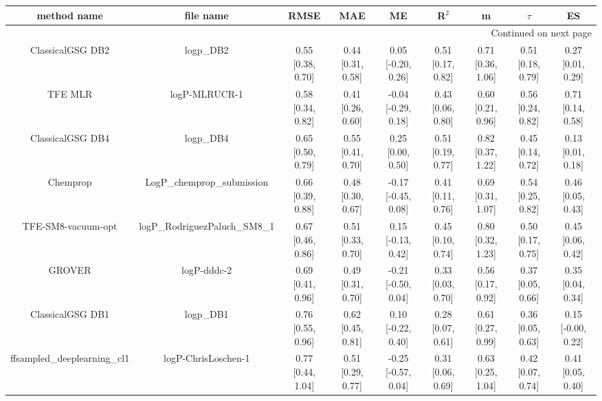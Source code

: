 \documentclass{article}
\begin{document}
\begin{center}
\scriptsize
\begin{longtable}{|ccccccccc|}
\toprule
                  method name &                                      file name &               RMSE &                MAE &                    ME &              R$^2$ &                     m &                $\tau$ &                    ES \\
\midrule
\endhead
\midrule
\multicolumn{9}{r}{{Continued on next page}} \\
\midrule
\endfoot

\bottomrule
\endlastfoot
             ClassicalGSG DB2 &                                      logp\_DB2 &  0.55 [0.38, 0.70] &  0.44 [0.31, 0.58] &    0.05 [-0.20, 0.26] &  0.51 [0.17, 0.82] &     0.71 [0.36, 1.06] &     0.51 [0.18, 0.79] &     0.27 [0.01, 0.29] \\
                      TFE MLR &                                  logP-MLRUCR-1 &  0.58 [0.34, 0.82] &  0.41 [0.26, 0.60] &   -0.04 [-0.29, 0.18] &  0.43 [0.06, 0.80] &     0.60 [0.21, 0.96] &     0.56 [0.24, 0.82] &     0.71 [0.14, 0.58] \\
             ClassicalGSG DB4 &                                      logp\_DB4 &  0.65 [0.50, 0.79] &  0.55 [0.41, 0.70] &     0.25 [0.00, 0.50] &  0.51 [0.19, 0.77] &     0.82 [0.37, 1.22] &     0.45 [0.14, 0.72] &     0.13 [0.01, 0.18] \\
                     Chemprop &                     LogP\_chemprop\_submission &  0.66 [0.39, 0.88] &  0.48 [0.30, 0.67] &   -0.17 [-0.45, 0.08] &  0.41 [0.11, 0.76] &     0.69 [0.31, 1.07] &     0.54 [0.25, 0.82] &     0.46 [0.05, 0.43] \\
           TFE-SM8-vacuum-opt &                  logP\_RodriguezPaluch\_SM8\_1 &  0.67 [0.46, 0.86] &  0.51 [0.33, 0.70] &    0.15 [-0.13, 0.42] &  0.45 [0.10, 0.74] &     0.80 [0.32, 1.23] &     0.50 [0.17, 0.75] &     0.45 [0.06, 0.42] \\
                       GROVER &                                    logP-dddc-2 &  0.69 [0.41, 0.96] &  0.49 [0.31, 0.70] &   -0.21 [-0.50, 0.04] &  0.33 [0.03, 0.70] &     0.56 [0.17, 0.92] &     0.37 [0.05, 0.66] &     0.35 [0.04, 0.34] \\
             ClassicalGSG DB1 &                                      logp\_DB1 &  0.76 [0.55, 0.96] &  0.62 [0.45, 0.81] &    0.10 [-0.22, 0.40] &  0.28 [0.07, 0.61] &     0.61 [0.27, 0.99] &     0.36 [0.05, 0.63] &    0.15 [-0.00, 0.22] \\
   ffsampled_deeplearning_cl1 &                            logP-ChrisLoschen-1 &  0.77 [0.44, 1.04] &  0.51 [0.29, 0.77] &   -0.25 [-0.57, 0.04] &  0.31 [0.06, 0.69] &     0.63 [0.25, 1.04] &     0.42 [0.07, 0.74] &     0.41 [0.05, 0.40] \\

\end{longtable}
\end{center}
\end{document}
